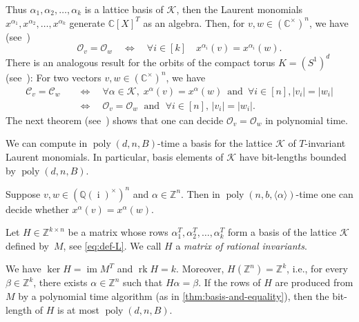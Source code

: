 \documentclass[a4paper,USenglish,cleveref,numberwithinsect]{lipics-v2021}
\DeclareMathOperator{\rk}{rk}
\DeclareMathOperator{\poly}{poly}
\DeclareMathOperator{\ii}{i}
\DeclareMathOperator{\ran}{im}
\newcommand{\QQ}{\mathbb{Q}}
\newcommand{\CC}{\mathbb{C}}
\newcommand{\ZZ}{\mathbb{Z}}
\newcommand{\OO}{\ensuremath{\mathcal{O}}}
\newcommand{\KK}{\ensuremath{\mathcal{C}}}
\numberwithin{equation}{section}
\begin{document}
Thus $\alpha_1,\alpha_2,\dots,\alpha_k$ is a lattice basis of $\mathcal{K}$,
then the Laurent monomials $x^{\alpha_1},x^{\alpha_2},\dots,x^{\alpha_k}$ generate
$\CC[X]^T$ as an algebra. Then, for $v,w\in(\CC^\times)^n$, we have
(see~\cite[Proposition 4.1]{torus})
\begin{equation}\label{prop:t-invariants}
\OO_v= \OO_w \quad \iff \quad \forall i\in [k] \quad x^{\alpha_i}(v)=x^{\alpha_i}(w) .
\end{equation}
There is an analogous result for the orbits of the compact torus $K=(S^1)^d$
(see~\cite[Proposition~8.1]{torus}):
For two vectors $v,w\in(\CC^\times)^n$, we have
\begin{equation}\label{prop:k-invariants}
\begin{split}
	\KK_v=\KK_w\quad &\iff\quad \forall \alpha\in\mathcal{K}, \;
     x^{\alpha}(v)=x^{\alpha}(w)\,\text{ and }\, \forall i\in [n], |v_i|=|w_i|\\
	         &\iff\quad \OO_v = \OO_w \;\text{ and }\;\forall i\in [n], \, |v_i|=|w_i|.
\end{split}
\end{equation}
The next theorem (see~\cite[Corollary~4.4 and Proposition~5.5]{torus})
shows that one can decide $\OO_v=\OO_w$ in polynomial time.

\begin{theorem}
\label{thm:basis-and-equality}
	\begin{alphaenumerate}
		\item\label{it:basis 1}
             We can compute in $\poly(d,n,B)$-time a basis for the lattice $\mathcal{K}$ of $T$-invariant
             Laurent monomials. In particular, basis elements of $\mathcal{K}$ have bit-lengths bounded by $\poly(d,n,B)$.
		\item\label{it:basis 2}
            Suppose $v,w\in(\QQ(\ii)^\times)^n$ and $\alpha\in\ZZ^n$. Then in $\poly(n,b,\langle \alpha\rangle)$-time
            one can decide whether $x^{\alpha}(v)=x^{\alpha}(w)$.
	\end{alphaenumerate}
\end{theorem}

Let $H\in\ZZ^{k\times n}$ be a matrix whose rows $\alpha_1^T,\alpha_2^T,\dots,\alpha_k^T$ form a basis of the lattice $\mathcal{K}$ defined by~$M$, see \cref{eq:def-L}.
We call $H$ a \textit{matrix of rational invariants}.

\begin{proposition}\label{prop:allaboutH}
We have $\ker H = \ran M^T$ and $\rk H=k$.
Moreover, $H(\ZZ^n)=\ZZ^k$, i.e., for every $\beta\in\ZZ^k$,
there exists $\alpha\in\ZZ^n$ such that $H\alpha=\beta$.
If the rows of $H$ are produced from $M$ by
a polynomial time algorithm (as in \cref{thm:basis-and-equality}),
then the bit-length of $H$ is at most $\poly(d,n,B)$.
\end{proposition}
\end{document}
